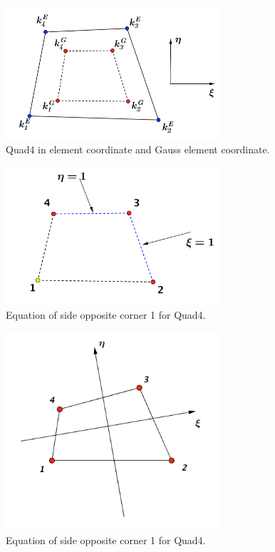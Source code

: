 \begin{figure}[h]
	\begin{center}
		\includegraphics[width=8cm,clip]{Quad4_1.pdf}			
		\caption{Quad4 in element coordinate and Gauss element coordinate.}	\label{fig: Quad4_1}
	\end{center} 
\end{figure}

\begin{figure}[h]
	\begin{center}
		\includegraphics[width=8cm,clip]{Quad4_2.pdf}			
		\caption{Equation of side opposite corner 1 for Quad4.} \label{fig: Quad4_2}
	\end{center} 
\end{figure}

\begin{figure}[h]
	\begin{center}
		\includegraphics[width=8cm,clip]{Quad4_basic.pdf}			
		\caption{Equation of side opposite corner 1 for Quad4.} \label{fig: Quad4_basic}
	\end{center} 
\end{figure}

